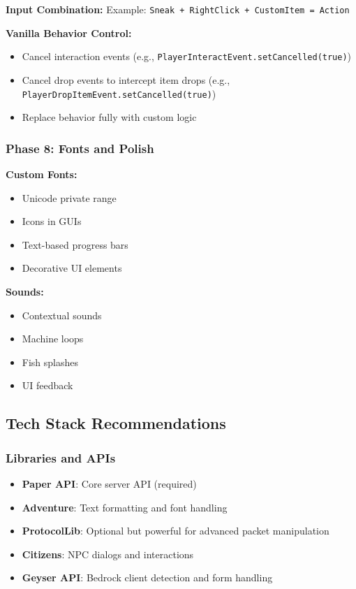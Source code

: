 \documentclass{article}
\begin{document}
\textbf{Input Combination:}
Example: \texttt{Sneak + RightClick + CustomItem = Action}

\textbf{Vanilla Behavior Control:}
\begin{itemize}
    \item Cancel interaction events (e.g., \texttt{PlayerInteractEvent.setCancelled(true)})
    \item Cancel drop events to intercept item drops (e.g., \texttt{PlayerDropItemEvent.setCancelled(true)})
    \item Replace behavior fully with custom logic
\end{itemize}

\subsubsection{Phase 8: Fonts and Polish}

\textbf{Custom Fonts:}
\begin{itemize}
    \item Unicode private range
    \item Icons in GUIs
    \item Text-based progress bars
    \item Decorative UI elements
\end{itemize}

\textbf{Sounds:}
\begin{itemize}
    \item Contextual sounds
    \item Machine loops
    \item Fish splashes
    \item UI feedback
\end{itemize}

\subsection{Tech Stack Recommendations}

\subsubsection{Libraries and APIs}

\begin{itemize}
    \item \textbf{Paper API}: Core server API (required)
    \item \textbf{Adventure}: Text formatting and font handling
    \item \textbf{ProtocolLib}: Optional but powerful for advanced packet manipulation
    \item \textbf{Citizens}: NPC dialogs and interactions
    \item \textbf{Geyser API}: Bedrock client detection and form handling
\end{itemize}
\end{document}
